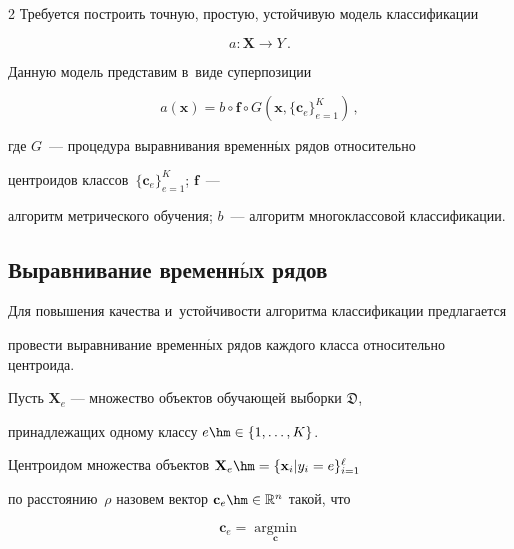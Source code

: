 \begin{multicols}{2}
Требуется построить точную, простую, устойчивую модель классификации


$$


    a: \mathbf{X} \to Y\,.


$$


Данную модель представим в~виде суперпозиции


\begin{equation*}




a(\mathbf{x}) = b \circ \mathbf{f} \circ G(\mathbf{x}, \{\mathbf{c}_e\}_{e = 1} ^ K)\,,


\end{equation*}


 где $G$~--- процедура выравнивания временн$\acute{\mbox{ы}}$х рядов относительно 


 центроидов классов~$\{\mathbf{c}_e\}_{e = 1} ^ K$; $\mathbf{f}$~--- 


 алгоритм метрического обучения; $b$~--- алгоритм многоклассовой классификации.





\subsection{Выравнивание временн$\acute{\mbox{ы}}$х рядов}





Для повышения качества и~устойчивости алгоритма классификации предлагается 


провести выравнивание временн$\acute{\mbox{ы}}$х рядов каждого класса относительно центроида.





Пусть $\mathbf{X}_e$ --- множество объектов обучающей выборки $\mathfrak{D}$, 


принадлежащих одному классу $e \hm\in \{1, \dots, K\}$.


Центроидом множества объектов $\mathbf{X}_e \hm= \{\mathbf{x}_i|y_i=e\}_{i=1}^\ell$ 


по расстоянию~$\rho$ назовем вектор $\mathbf{c}_e \hm\in \mathbb{R}^n$ такой, что


\begin{equation}


\label{centroid_task}


    \mathbf{c}_e = \mathop{\mathrm{argmin}}\limits_{{\mathbf{c} 


}}
\end{equation}
\end{multicols}

